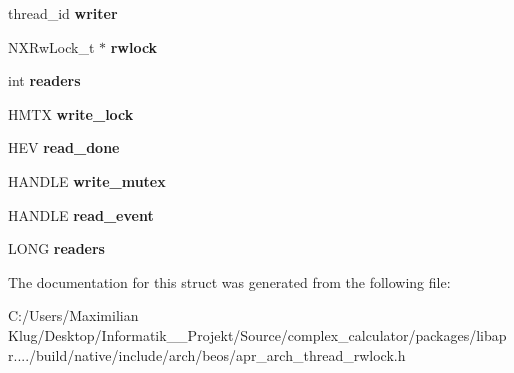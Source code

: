 \begin{DoxyCompactItemize}
\mbox{\label{structapr__thread__rwlock__t_a18110373a77fa08c50177cc517a7b4a2}} 
thread\+\_\+id {\bfseries writer}
\item 
\mbox{\label{structapr__thread__rwlock__t_a8c70729c99deea4cc87fcf4a86e9557a}} 
N\+X\+Rw\+Lock\+\_\+t $\ast$ {\bfseries rwlock}
\item 
\mbox{\label{structapr__thread__rwlock__t_ab8638740d20adc387e147b64e268c5ae}} 
int {\bfseries readers}
\item 
\mbox{\label{structapr__thread__rwlock__t_a493035e2c36f15766f3642a93a3d2914}} 
H\+M\+TX {\bfseries write\+\_\+lock}
\item 
\mbox{\label{structapr__thread__rwlock__t_a904c730f204f04dc171174b045463075}} 
H\+EV {\bfseries read\+\_\+done}
\item 
\mbox{\label{structapr__thread__rwlock__t_abf5aa056b9db8095082d12372f531e3a}} 
H\+A\+N\+D\+LE {\bfseries write\+\_\+mutex}
\item 
\mbox{\label{structapr__thread__rwlock__t_ae30c25f4756c85054f530db78b4403b6}} 
H\+A\+N\+D\+LE {\bfseries read\+\_\+event}
\item 
\mbox{\label{structapr__thread__rwlock__t_a0a7f396f5a9ead8e61ec379f2971f856}} 
L\+O\+NG {\bfseries readers}
\end{DoxyCompactItemize}


The documentation for this struct was generated from the following file\+:\begin{DoxyCompactItemize}
\item 
C\+:/\+Users/\+Maximilian Klug/\+Desktop/\+Informatik\+\_\+\_\+\+Projekt/\+Source/complex\+\_\+calculator/packages/libapr..../build/native/include/arch/beos/apr\+\_\+arch\+\_\+thread\+\_\+rwlock.\+h\end{DoxyCompactItemize}
